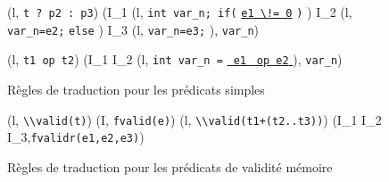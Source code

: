 \begin{figure*}[bt]
{    {
      {
        (l, \mbox{\lstinline't ? p2 : p3'}) 
        (I_1 \concat (l, \mbox{\lstinline'int var_n; if('}
        \underline{\mbox{\lstinline'e1'}\Zclear \mbox{\lstinline' \!= 0'}}
        \mbox{\lstinline')'} \bopen)
        \concat I_2 \concat (l, \mbox{\lstinline'var_n=e2;'} \bclose
        \mbox{\lstinline'else'} \bopen)
        \concat I_3 \concat (l, \mbox{\lstinline'var_n=e3;'} \bclose),
        \mbox{\lstinline'var_n'})
      }
    }

    {
      {(l, \mbox{\lstinline't1 op t2'}) 
        (I_1 \concat I_2 \concat (l,
        \mbox{\lstinline'int var_n ='}
        \underline{\mbox{\lstinline' e1'} \Zclear \mbox{\lstinline' op e2'}
          \Zclear}
        \semicolon
        ), \mbox{\lstinline'var_n'})}
    }
  }
  \caption{Règles de traduction pour les prédicats simples}
  \label{fig:pred-logic}
\end{figure*}

\begin{figure*}[bt]
  \scriptsize{
    {
      {(l, \mbox{\lstinline'\\valid(t)'}) 
        (I, \mbox{\lstinline'fvalid(e)'})
      }
    }
    { {
        (l, \mbox{\lstinline'\\valid(t1+(t2..t3))'}) 
        (I_1 \concat I_2 \concat I_3,\mbox{\lstinline'fvalidr(e1,e2,e3)'})
      }
    }
  }
  \caption{Règles de traduction pour les prédicats de validité mémoire}
  \label{fig:valid}
\end{figure*}

